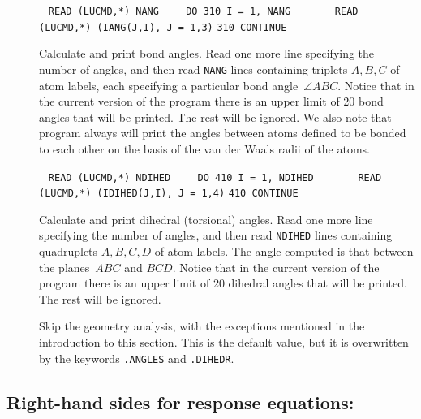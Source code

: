 \begin{description}
\item[]\verb| |\newline
\verb|READ (LUCMD,*) NANG|\newline
\verb|    DO 310 I = 1, NANG|\newline
\verb|       READ (LUCMD,*) (IANG(J,I), J = 1,3)|\newline
\verb|310 CONTINUE|

Calculate and print
bond angles. Read one
more line specifying the number of angles, and then read \verb|NANG|
lines containing triplets $A,B,C$ of atom labels, each
specifying a particular bond angle~$\angle ABC$. Notice that in the
current version of the program there is an upper limit of 20 bond
angles that will be printed. The rest will be ignored. We also note
that program always will print the angles between atoms defined to be
bonded to each other on the basis of the van der Waals radii of the atoms.

\item[]\verb| |\newline
\verb|READ (LUCMD,*) NDIHED|\newline
\verb|    DO 410 I = 1, NDIHED|\newline
\verb|       READ (LUCMD,*) (IDIHED(J,I), J = 1,4)|\newline
\verb|410 CONTINUE|

Calculate and print dihedral
(torsional) angles.  Read one more line specifying the number of angles,
and then read \verb|NDIHED| lines containing quadruplets $A,B,C,D$ of atom
labels.  The angle computed is that between the planes~$ABC$
and $BCD$. Notice that in the current version of the program there is
an upper limit of 20 dihedral angles that will be printed. The rest
will be ignored.

\item[] Skip the geometry analysis, with the exceptions
mentioned in the introduction to this section. This is the default
value, but it is overwritten by the keywords \verb|.ANGLES| and
\verb|.DIHEDR|. 
\end{description}

\subsection{Right-hand sides for response equations: }

